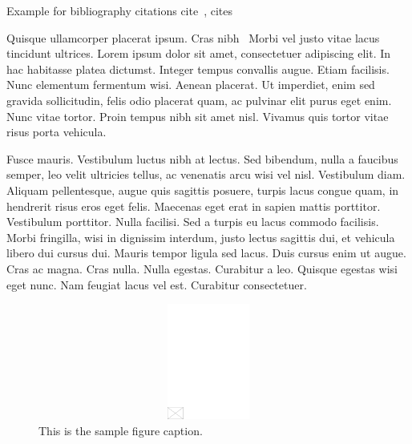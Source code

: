 \documentclass[AMS,STIX2COL]{WileyNJD-v2}
\begin{document}
    Example for bibliography citations cite~\citep{Elbaum2002}, cites~\cite{Allen2011,Yoo2007}

    Quisque ullamcorper placerat ipsum. Cras nibh~\cite{Yoo2007,Schulz2012} Morbi vel justo vitae lacus tincidunt ultrices. Lorem ipsum dolor sit
    amet, consectetuer adipiscing elit. In hac habitasse platea dictumst. Integer tempus convallis augue. Etiam facilisis.
    Nunc elementum fermentum wisi. Aenean placerat. Ut imperdiet, enim sed gravida sollicitudin, felis odio placerat quam, ac pulvinar elit purus eget enim. Nunc vitae tortor. Proin tempus nibh sit amet nisl. Vivamus quis tortor
    vitae risus porta vehicula.

    Fusce mauris. Vestibulum luctus nibh at lectus. Sed bibendum, nulla a faucibus semper, leo velit ultricies tellus, ac venenatis arcu wisi vel nisl. Vestibulum diam. Aliquam pellentesque, augue quis sagittis posuere, turpis lacus congue quam, in hendrerit risus eros eget felis. Maecenas eget erat in sapien mattis porttitor. Vestibulum porttitor. Nulla facilisi. Sed a turpis eu lacus commodo facilisis. Morbi fringilla, wisi in dignissim interdum, justo lectus sagittis dui, et vehicula libero dui cursus dui. Mauris tempor ligula sed lacus. Duis cursus enim ut augue. Cras ac magna. Cras nulla.
    Nulla egestas. Curabitur a leo. Quisque egestas wisi eget nunc. Nam feugiat lacus vel est. Curabitur consectetuer.


    \begin{figure}[t]
        \centerline{\includegraphics[width=342pt,height=9pc,draft]{empty}}
        \caption{This is the sample figure caption.\label{fig1}}
    \end{figure}
\end{document}
